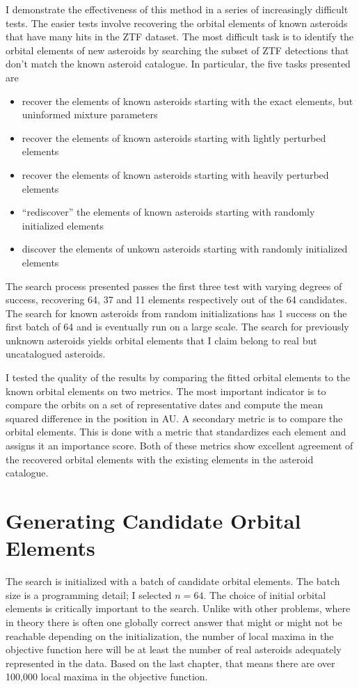 I demonstrate the effectiveness of this method in a series of increasingly difficult tests.  
The easier tests involve recovering the orbital elements of known asteroids that have many hits in the ZTF dataset.
The most difficult task is to identify the orbital elements of new asteroids by searching the subset of ZTF detections that don't match the known asteroid catalogue.
In particular, the five tasks presented are
\begin{itemize}
\item recover the elements of known asteroids starting with the exact elements, but uninformed mixture parameters
\item recover the elements of known asteroids starting with lightly perturbed elements
\item recover the elements of known asteroids starting with heavily perturbed elements
\item ``rediscover'' the elements of known asteroids starting with randomly initialized elements
\item discover the elements of unkown asteroids starting with randomly initialized elements
\end{itemize}
The search process presented passes the first three test with varying degrees of success, recovering 64, 37 and 11 elements respectively out of the 64 candidates.
The search for known asteroids from random initializations has 1 success on the first batch of 64 and is eventually run on a large scale.
The search for previously unknown asteroids yields  orbital elements that I claim belong to real but uncatalogued asteroids.

I tested the quality of the results by comparing the fitted orbital elements to the known orbital elements on two metrics.
The most important indicator is to compare the orbits on a set of representative dates and compute the mean squared difference in the position in AU.
A secondary metric is to compare the orbital elements.  
This is done with a metric that standardizes each element and assigns it an importance score.
Both of these metrics show excellent agreement of the recovered orbital elements with the existing elements in the asteroid catalogue.

\section{Generating Candidate Orbital Elements}
\label{section_candidate_elements}
The search is initialized with a batch of candidate orbital elements. 
The batch size is a programming detail; I selected $n=64$.
The choice of initial orbital elements is critically important to the search.
Unlike with other problems, where in theory there is often one globally correct answer 
that might or might not be reachable depending on the initialization, 
the number of local maxima in the objective function here will be at least the number of real asteroids adequately represented in the data.
Based on the last chapter, that means there are over 100,000 local maxima in the objective function.

